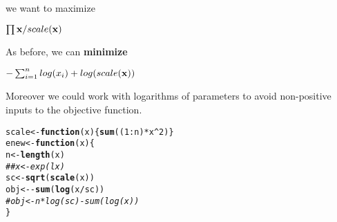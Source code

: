 \documentclass[11pt]{article}\usepackage[]{graphicx}\usepackage[]{color}
\makeatletter
\newcommand{\hlnum}[1]{\textcolor[rgb]{0.686,0.059,0.569}{#1}}%
\newcommand{\hlcom}[1]{\textcolor[rgb]{0.678,0.584,0.686}{\textit{#1}}}%
\newcommand{\hlopt}[1]{\textcolor[rgb]{0,0,0}{#1}}%
\newcommand{\hlstd}[1]{\textcolor[rgb]{0.345,0.345,0.345}{#1}}%
\newcommand{\hlkwa}[1]{\textcolor[rgb]{0.161,0.373,0.58}{\textbf{#1}}}%
\newcommand{\hlkwb}[1]{\textcolor[rgb]{0.69,0.353,0.396}{#1}}%
\newcommand{\hlkwc}[1]{\textcolor[rgb]{0.333,0.667,0.333}{#1}}%
\newcommand{\hlkwd}[1]{\textcolor[rgb]{0.737,0.353,0.396}{\textbf{#1}}}%
\newenvironment{kframe}{%
 \def\at@end@of@kframe{}%
 \ifinner\ifhmode%
  \def\at@end@of@kframe{\end{minipage}}%
  \begin{minipage}{\columnwidth}%
 \fi\fi%
 \def\FrameCommand##1{\hskip\@totalleftmargin \hskip-\fboxsep
 \colorbox{shadecolor}{##1}\hskip-\fboxsep
     \hskip-\linewidth \hskip-\@totalleftmargin \hskip\columnwidth}%
 \MakeFramed {\advance\hsize-\width
   \@totalleftmargin\z@ \linewidth\hsize
   \@setminipage}}%
 {\par\unskip\endMakeFramed%
 \at@end@of@kframe}
\newenvironment{knitrout}{}{} %
\newcommand{\B}[1]{{\bf #1 \rm}}
\makeatother
\begin{document}
we want to maximize 

$ \prod{\B{x}} / scale({\B{x})} $

As before, we can \B{minimize}

$  - \sum_{i=1}^n{log(x_i)} + log(scale({\B{x})}) $

Moreover we could work with logarithms of parameters to avoid non-positive inputs to the objective function.


\begin{knitrout}\scriptsize
{}\color{fgcolor}\begin{kframe}
\begin{alltt}
\hlstd{scale} \hlkwb{<-} \hlkwa{function}\hlstd{(}\hlkwc{x}\hlstd{) \{}\hlkwd{sum}\hlstd{( (}\hlnum{1}\hlopt{:}\hlstd{n)} \hlopt{*} \hlstd{x}\hlopt{^}\hlnum{2}\hlstd{)\}}
\hlstd{enew} \hlkwb{<-} \hlkwa{function}\hlstd{(}\hlkwc{x}\hlstd{)\{}
  \hlstd{n} \hlkwb{<-} \hlkwd{length}\hlstd{(x)}
\hlcom{##  x <- exp(lx)}
  \hlstd{sc} \hlkwb{<-} \hlkwd{sqrt}\hlstd{(}\hlkwd{scale}\hlstd{(x))}
  \hlstd{obj} \hlkwb{<-} \hlopt{-} \hlkwd{sum}\hlstd{(}\hlkwd{log}\hlstd{(x}\hlopt{/}\hlstd{sc))}
\hlcom{#  obj <- n*log(sc)-sum(log(x))}
\hlstd{\}}
\end{alltt}
\end{kframe}
\end{knitrout}
\end{document}
